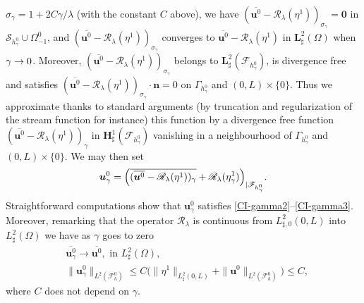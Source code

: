 \documentclass[10pt]{amsart}
\let\mathcal\mathscr
\theoremstyle{remark}
\theoremstyle{definition}
\newcommand{\ug}{\boldsymbol{u}}
\newcommand{\BS}[1]{\boldsymbol{#1}}
\let\CM\Omega
\begin{document}
$\sigma_{\gamma}\!=\!1+ 2C\gamma/\lambda$ (with the constant $C$ above), we have \hbox{$(\overline{\ug^{0}}\!-\!\mathcal{R}_\lambda(\eta^1))_{\sigma_\gamma}\!=\BS{0}$} in $\mathcal{S}_{h_\gamma^0}\cup \Omega_{-1}^0$, and $(\overline{\ug^{0}}-\mathcal{R}_\lambda(\eta^1))_{\sigma_\gamma}$ converges to $\overline{\ug^{0}}-\mathcal{R}_\lambda(\eta^1)$ in $\BS{L}_\sharp^2(\CM)$ when $\gamma \to\nobreak 0$. Moreover, $(\overline{\ug^{0}}-\mathcal{R}_\lambda(\eta^1))_{\sigma_\gamma}$ belongs to $\BS{L}^2_{\sharp}(\mathcal{F}_{h_\gamma^0})$, is divergence free and satisfies $(\overline{\ug^{0}}-\mathcal{R}_\lambda(\eta^1))_{\sigma_\gamma}\cdot\BS{n} =0$ on $\Gamma_{h^0_\gamma}$ and $(0, L)\times\{0\}$. Thus we approximate thanks to standard arguments (by truncation and regularization of the stream function for instance) this function by a divergence free function $(\overline{\ug^{0}}-\mathcal{R}_\lambda(\eta^1))_{\gamma}$ in $\BS{H}^1_{\sharp}(\mathcal{F}_{h_\gamma^0})$ vanishing in a neighbourhood of $\Gamma_{h^0_\gamma}$ and $(0, L)\times\{0\}$. We may then set
\[
\ug_{\gamma}^0 = \Bigl( \overline{(\overline{\ug^{0}}-\mathcal{R}_\lambda(\eta^1))_{\gamma} }+\mathcal{R}_\lambda(\eta_\gamma^1)\Bigr)_{|{\mathcal{F}_{h_\gamma^0}}}.
\]
Straightforward computations show that $\ug_{\gamma}^0$ satisfies \eqref{CI-gamma2}--\eqref{CI-gamma3}. Moreover,
remarking that the operator $\mathcal R_{\lambda}$ is continuous from $L^2_{\sharp,0}(0,L)$ into $L_\sharp^2(\Omega)$ we have as $\gamma$ goes to zero
\begin{align*}
& \overline{\ug^0_\gamma}\to \overline{\ug^0}, \text{ in }L^2_\sharp(\Omega),\\
& \| \ug^0_\gamma \|_{{L}^2(\mathcal F^0_{h})}\leq C\bigl( \|\eta^1\|_{L^2_\sharp(0, L)} + \|\ug^0\|_{L^2(\mathcal F_h^0)} \bigr)\leq C,
\end{align*}
where $C$ does not depend on $\gamma$.
\end{document}
